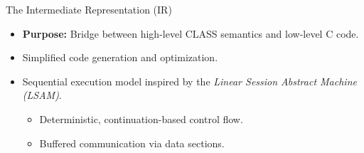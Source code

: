 \documentclass{beamer}
\begin{document}
\begin{frame}{The Intermediate Representation (IR)}
\begin{itemize}
  \item \textbf{Purpose:} Bridge between high-level CLASS semantics and low-level C code.
  \item Simplified code generation and optimization.
  \item Sequential execution model inspired by the \textit{Linear Session Abstract Machine (LSAM)}. \begin{itemize}
    \item Deterministic, continuation-based control flow.
    \item Buffered communication via data sections.
  \end{itemize}
\end{itemize}
\end{frame}








\end{document}

